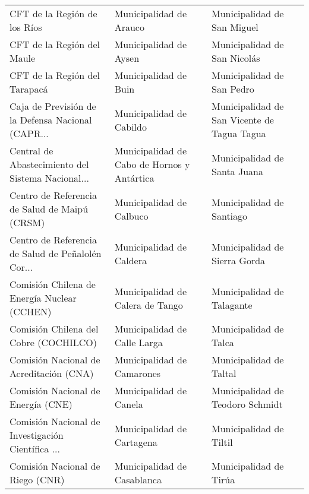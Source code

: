 \documentclass[11pt]{article}
\begin{document}
\begin{longtable}{ p{5cm} | p{5cm} | p{5cm} }
                      CFT de la Región de los Ríos &                            Municipalidad de Arauco &                        Municipalidad de San Miguel \\
                        CFT de la Región del Maule &                             Municipalidad de Aysen &                       Municipalidad de San Nicolás \\
                     CFT de la Región del Tarapacá &                              Municipalidad de Buin &                         Municipalidad de San Pedro \\
 Caja de Previsión de la Defensa Nacional (CAPR... &                           Municipalidad de Cabildo &        Municipalidad de San Vicente de Tagua Tagua \\
 Central de Abastecimiento del Sistema Nacional... &        Municipalidad de Cabo de Hornos y Antártica &                       Municipalidad de Santa Juana \\
     Centro de Referencia de Salud de Maipú (CRSM) &                           Municipalidad de Calbuco &                          Municipalidad de Santiago \\
 Centro de Referencia de Salud de Peñalolén Cor... &                           Municipalidad de Caldera &                      Municipalidad de Sierra Gorda \\
       Comisión Chilena de Energía Nuclear (CCHEN) &                   Municipalidad de Calera de Tango &                         Municipalidad de Talagante \\
             Comisión Chilena del Cobre (COCHILCO) &                       Municipalidad de Calle Larga &                             Municipalidad de Talca \\
           Comisión Nacional de Acreditación (CNA) &                         Municipalidad de Camarones &                            Municipalidad de Taltal \\
                Comisión Nacional de Energía (CNE) &                            Municipalidad de Canela &                   Municipalidad de Teodoro Schmidt \\
 Comisión Nacional de Investigación Científica ... &                         Municipalidad de Cartagena &                            Municipalidad de Tiltil \\
                  Comisión Nacional de Riego (CNR) &                        Municipalidad de Casablanca &                             Municipalidad de Tirúa \\

\end{longtable}
\end{document}
